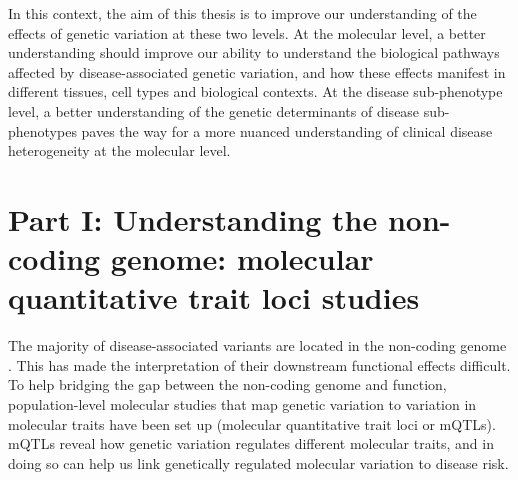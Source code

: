 In this context, the aim of this thesis is to improve our understanding of the effects of genetic variation at these two levels. At the molecular level, a better understanding should improve our ability to understand the biological pathways affected by disease-associated genetic variation, and how these effects manifest in different tissues, cell types and biological contexts. At the disease sub-phenotype level, a better understanding of the genetic determinants of disease sub-phenotypes paves the way for a more nuanced understanding of clinical disease heterogeneity at the molecular level. 



\section{Part I: Understanding the non-coding genome: molecular quantitative trait loci studies}
The majority of disease-associated variants are located in the non-coding genome \cite{Ahonen2009-eo,Degner2012-dq,Trynka2013-qs,Hindorff2009-te}. This has made the interpretation of their downstream functional effects difficult. To help bridging the gap between the non-coding genome and function, population-level molecular studies that map genetic variation to variation in molecular traits have been set up (molecular quantitative trait loci or mQTLs). mQTLs reveal how genetic variation regulates different molecular traits, and in doing so can help us link genetically regulated molecular variation to disease risk.\\ 

